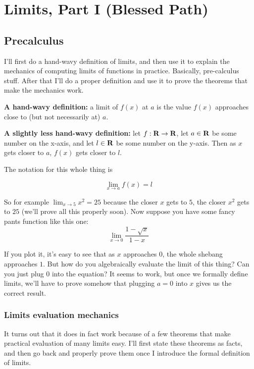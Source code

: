 \section{Limits, Part I (Blessed Path)}

\subsection{Precalculus}

I'll first do a hand-wavy definition of limits, and then use it to
explain the mechanics of computing limits of functions in practice.
Basically, pre-calculus stuff. After that I'll do a proper definition
and use it to prove the theorems that make the mechanics work.

\vs

\textbf{A hand-wavy definition:} a limit of $f(x)$ at $a$ is the value
$f(x)$ approaches close to (but not necessarily at) $a$.

\vs

\textbf{A slightly less hand-wavy definition:} let $f:\mathbf{R}\to\mathbf{R}$, let
$a\in\mathbf{R}$ be some number on the x-axis, and let $l\in\mathbf{R}$ be some number on
the y-axis. Then as $x$ gets closer to $a$, $f(x)$ gets closer to $l$.

\vs

The notation for this whole thing is

\[\lim_{x\to a} f(x)=l\]

So for example $\lim_{x\to5}x^2=25$ because the closer $x$ gets to
$5$, the closer $x^2$ gets to $25$ (we'll prove all this properly
soon). Now suppose you have some fancy pants function like this one:
\begin{equation}
\label{eq:1}
\lim_{x\to 0}\frac{1-\sqrt{x}}{1-x}
\end{equation}

If you plot it, it's easy to see that as $x$ approaches $0$, the whole
shebang approaches $1$. But how do you algebraically evaluate the
limit of this thing? Can you just plug $0$ into the equation? It seems
to work, but once we formally define limits, we'll have to prove
somehow that plugging $a=0$ into $x$ gives us the correct result.

\subsubsection*{Limits evaluation mechanics}

It turns out that it does in fact work because of a few theorems that
make practical evaluation of many limits easy. I'll first state these
theorems as facts, and then go back and properly prove them once I
introduce the formal definition of limits.


